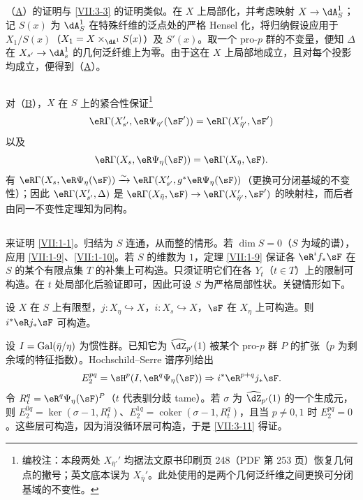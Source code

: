 \subsection{}\label{VII:3-8}

（\hyperlink{VII:3-A}{A}）的证明与 \ref{VII:3-3} 的证明类似。在 $X$ 上局部化，并考虑映射 $X\to \dA_S^1$；记 $S(x)$ 为 $\dA_S^1$ 在特殊纤维的泛点处的严格 Hensel 化，将归纳假设应用于 $X_1/S(x)$（$X_1=X\times_{\dA^1} S(x)$）及 $S'(x)$。取一个 pro-$p$ 群的不变量，便知 $\Delta$ 在 $X_{s'} \to \dA_s^1$ 的几何泛纤维上为零。由于这在 $X$ 上局部地成立，且对每个投影均成立，便得到（\hyperlink{VII:3-A}{A}）。

\subsection{}\label{VII:3-9}

对（\hyperlink{VII:3-B}{B}），$X$ 在 $S$ 上的紧合性保证\footnote{编校注：本段两处 $X_{\bar\eta'}'$ 均据法文原书印刷页 248（PDF 第 253 页）恢复几何点的撇号；英文底本误为 $X_{\bar\eta}'$。此处使用的是两个几何泛纤维之间更换可分闭基域的不变性。}
\[
  \eR\Gamma(X_{s'}',\eR\Psi_{\eta'}(\sF')) = \eR\Gamma(X_{\bar\eta'}',\sF')
\]
以及
\[
  \eR\Gamma(X_s,\eR\Psi_\eta(\sF)) = \eR\Gamma(X_{\bar\eta},\sF) \text{.}
\]
有 $\eR\Gamma(X_s,\eR\Psi_\eta(\sF))\iso \eR\Gamma(X_{s'}',g^\ast\eR\Psi_\eta(\sF))$（更换可分闭基域的不变性）；因此 $\eR\Gamma(X_{s'}', \Delta)$ 是 $\eR\Gamma(X_{\bar\eta},\sF) \to \eR\Gamma(X_{\bar\eta'}',\sF')$ 的映射柱，而后者由同一不变性定理知为同构。

\subsection{}\label{VII:3-10}

来证明 \ref{VII:1-1}。归结为 $S$ 连通，从而整的情形。若 $\dim S=0$（$S$ 为域的谱），应用 \ref{VII:1-9}、\ref{VII:1-10}。若 $S$ 的维数为 $1$，定理 \ref{VII:1-9} 保证各 $\eR^i f_\ast \sF$ 在 $S$ 的某个有限点集 $T$ 的补集上可构造。只须证明它们在各 $Y_t$（$t\in T$）上的限制可构造。在 $t$ 处局部化后验证即可，因此可设 $S$ 为严格局部性状。关键情形如下。

\begin{lemma_}\label{VII:3-11}
设 $X$ 在 $S$ 上有限型，$j:X_\eta\hookrightarrow X$，$i:X_s\hookrightarrow X$，$\sF$ 在 $X_\eta$ 上可构造。则 $i^\ast\eR j_\ast \sF$ 可构造。
\end{lemma_}

设 $I=\operatorname{Gal}(\bar\eta/\eta)$ 为惯性群。已知它为 $\widehat\dZ_{p'}(1)$ 被某个 pro-$p$ 群 $P$ 的扩张（$p$ 为剩余域的特征指数）。Hochschild--Serre 谱序列给出
\[
  E_2^{p q} = \sH^p(I,\eR^q\Psi_\eta(\sF))\Rightarrow i^\ast \eR^{p+q}j_\ast\sF \text{.}
\]
令 $R_t^q = \eR^q\Psi_\eta(\sF)^P$（$t$ 代表驯分歧 tame）。若 $\sigma$ 为 $\widehat\dZ_{p'}(1)$ 的一个生成元，则 $E_2^{0 q} = \ker(\sigma-1,R_t^q)$、$E_2^{1 q} = \operatorname{coker}(\sigma-1,R_t^q)$，且当 $p\ne 0,1$ 时 $E_2^{p q} = 0$。这些层可构造，因为消没循环层可构造，于是 \ref{VII:3-11} 得证。


